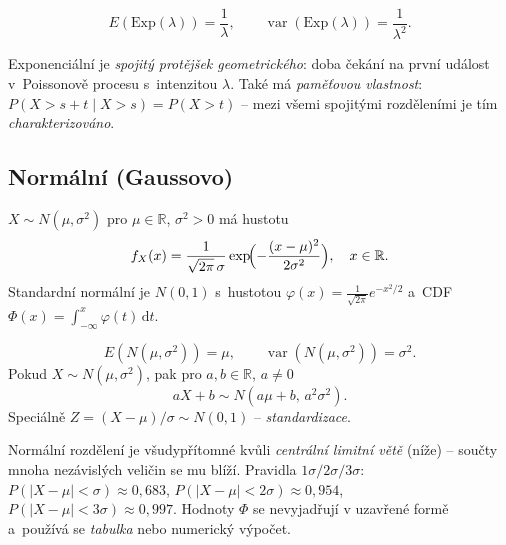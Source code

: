 \documentclass[11pt,a4paper]{article}
\DeclareMathOperator{\Var}{var}
\newcommand{\R}{\mathbb{R}}
\begin{document}
\begin{veta}
\[
E(\mathrm{Exp}(\lambda))=\frac{1}{\lambda},\qquad \Var(\mathrm{Exp}(\lambda))=\frac{1}{\lambda^2}.
\]
\end{veta}

\begin{intuice}
Exponenciální je \emph{spojitý protějšek geometrického}: doba čekání na první událost v~Poissonově procesu s~intenzitou $\lambda$. Také má \emph{paměťovou vlastnost}: $P(X>s+t\mid X>s)=P(X>t)$ -- mezi všemi spojitými rozděleními je tím \emph{charakterizováno}.
\end{intuice}

\subsection{Normální (Gaussovo)}

\begin{definice}[$N(\mu,\sigma^2)$]
$X\sim N(\mu,\sigma^2)$ pro $\mu\in\R$, $\sigma^2>0$ má hustotu
\[
f_X(x)=\frac{1}{\sqrt{2\pi}\,\sigma}\exp\!\Bigl(-\frac{(x-\mu)^2}{2\sigma^2}\Bigr),\quad x\in\R.
\]
Standardní normální je $N(0,1)$ s~hustotou $\varphi(x)=\tfrac{1}{\sqrt{2\pi}}e^{-x^2/2}$ a~CDF $\Phi(x)=\int_{-\infty}^{x}\varphi(t)\,\mathrm{d}t$.
\end{definice}

\begin{veta}
\[
E(N(\mu,\sigma^2))=\mu,\qquad \Var(N(\mu,\sigma^2))=\sigma^2.
\]
Pokud $X\sim N(\mu,\sigma^2)$, pak pro $a,b\in\R$, $a\ne 0$
\[
aX+b\sim N(a\mu+b,\,a^2\sigma^2).
\]
Speciálně $Z=(X-\mu)/\sigma\sim N(0,1)$ -- \emph{standardizace}.
\end{veta}

\begin{intuice}
Normální rozdělení je všudypřítomné kvůli \emph{centrální limitní větě} (níže) -- součty mnoha nezávislých veličin se mu blíží. Pravidla $1\sigma/2\sigma/3\sigma$: $P(|X-\mu|<\sigma)\approx 0{,}683$, $P(|X-\mu|<2\sigma)\approx 0{,}954$, $P(|X-\mu|<3\sigma)\approx 0{,}997$. Hodnoty $\Phi$ se nevyjadřují v uzavřené formě a~používá se \emph{tabulka} nebo numerický výpočet.
\end{intuice}

\end{document}
